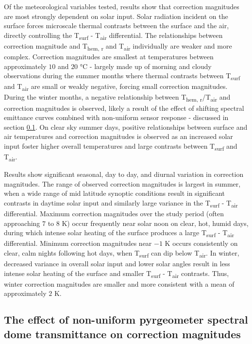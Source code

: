 Of the meteorological variables tested, results show that correction magnitudes are most strongly dependent on solar input. Solar radiation incident on the surface forces microscale thermal contrasts between the surface and the air, directly controlling the T\textsubscript{surf} - T\textsubscript{air} differential. The relationships between correction magnitude and T\textsubscript{hem, r} and T\textsubscript{air} individually are weaker and more complex. Correction magnitudes are smallest at temperatures between approximately $10$ and $20$ \si{\degreeCelsius} - largely made up of morning and cloudy observations during the summer months where thermal contrasts between T\textsubscript{surf} and T\textsubscript{air} are small or weakly negative, forcing small correction magnitudes. During the winter months, a negative relationship between T\textsubscript{hem, r}/T\textsubscript{air} and correction magnitudes is observed, likely a result of the effect of shifting spectral emittance curves combined with non-uniform sensor response - discussed in section \ref{Persistence in correction magnitudes}. On clear sky summer days, positive relationships between surface and air temperatures and correction magnitudes is observed as an increased solar input foster higher overall temperatures and large contrasts between T\textsubscript{surf} and T\textsubscript{air}.

Results show significant seasonal, day to day, and diurnal variation in correction magnitudes. The range of observed correction magnitudes is largest in summer, when a wide range of mid latitude synoptic conditions result in significant contrasts in daytime solar input and similarly large variance in the T\textsubscript{surf} - T\textsubscript{air} differential. Maximum correction magnitudes over the study period (often approaching $7$ to $8$ \si{\kelvin}) occur frequently near solar noon on clear, hot, humid days, during which intense solar heating of the surface produces a large T\textsubscript{surf} - T\textsubscript{air} differential. Minimum correction magnitudes near $-1$ \si{\kelvin} occurs consistently on clear, calm nights following hot days, when T\textsubscript{surf} can dip below T\textsubscript{air}. In winter, decreased variance in overall solar input and lower solar angles result in less intense solar heating of the surface and smaller T\textsubscript{surf} - T\textsubscript{air} contrasts. Thus, winter correction magnitudes are smaller and more consistent with a mean of approximately $2$ \si{\kelvin}.

\subsection{The effect of non-uniform pyrgeometer spectral dome transmittance on correction magnitudes}\label{Persistence in correction magnitudes}

